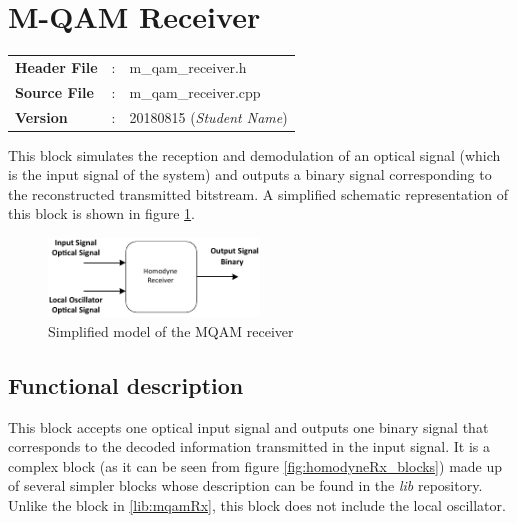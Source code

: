 \clearpage

\section{M-QAM Receiver}\label{lib:homodyneRx}

\begin{tcolorbox}	
	\begin{tabular}{p{2.75cm} p{0.2cm} p{10.5cm}} 	
		\textbf{Header File}   &:& m\_qam\_receiver.h \\
		\textbf{Source File}   &:& m\_qam\_receiver.cpp \\
        \textbf{Version}       &:& 20180815 (\emph{Student Name})\\
	\end{tabular}
\end{tcolorbox}

This block simulates the reception and demodulation of an optical
signal (which is the input signal of the system) and outputs a binary signal
corresponding to the reconstructed transmitted bitstream.
 A simplified schematic representation of this block is shown in
figure
\ref{fig:homodyneRx_simple}.

\begin{figure}[h]
	\centering
	\includegraphics[width=0.5\textwidth]{../lib/m_qam_receiver/figures/homodyneRx_simple.pdf}
	\caption{Simplified model of the MQAM
	receiver}\label{fig:homodyneRx_simple}
\end{figure}

\subsection*{Functional description}

This block accepts one optical input signal and outputs one binary signal that
corresponds to the decoded information transmitted in the input signal. It is a
complex
block (as it can be seen from figure \ref{fig:homodyneRx_blocks}) made up of
several simpler blocks whose description can be found in the
\textit{lib} repository. Unlike the block in \ref{lib:mqamRx}, this block does
not include the local oscillator.

